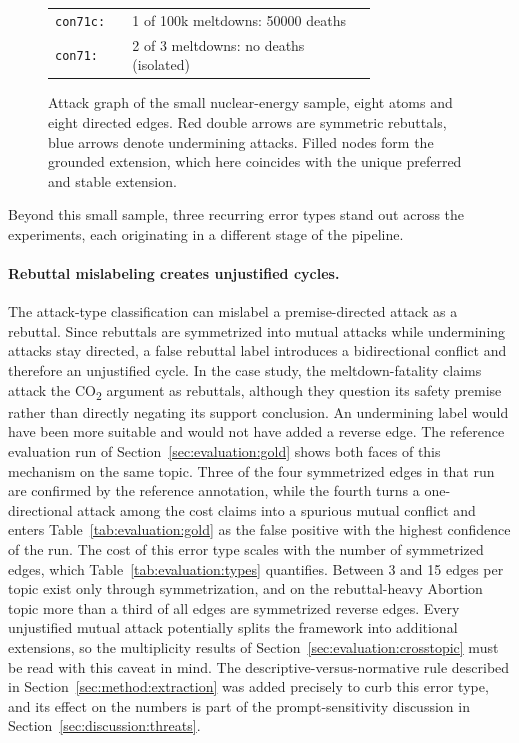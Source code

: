 \begin{figure}[tb]
\begin{minipage}[c]{0.48\linewidth}
\begin{tabular}{@{}l@{\ }p{0.76\linewidth}@{}}
      \texttt{con71c:} & 1 of 100k meltdowns: 50000 deaths \\
      \texttt{con71:}  & 2 of 3 meltdowns: no deaths (isolated) \\
    \end{tabular}
  \end{minipage}
  \caption{Attack graph of the small nuclear-energy sample, eight atoms and eight
  directed edges. Red double arrows are symmetric rebuttals, blue arrows denote
  undermining attacks. Filled nodes form the grounded extension, which here
  coincides with the unique preferred and stable extension.}
  \label{fig:evaluation:nuclear}
\end{figure}

Beyond this small sample, three recurring error types stand out across the
experiments, each originating in a different stage of the pipeline.

\paragraph{Rebuttal mislabeling creates unjustified cycles.}
The attack-type classification can mislabel a premise-directed attack as a
rebuttal. Since rebuttals are symmetrized into mutual attacks while undermining
attacks stay directed, a false rebuttal label introduces a bidirectional
conflict and therefore an unjustified cycle. In the case study, the
meltdown-fatality claims attack the CO\textsubscript{2} argument as rebuttals,
although they question its safety premise rather than directly negating its
support conclusion. An undermining label would have been more suitable and
would not have added a reverse edge. The reference evaluation run of
Section~\ref{sec:evaluation:gold} shows both faces of this mechanism on the
same topic. Three of the four symmetrized edges in that run are confirmed by
the reference annotation, while the fourth turns a one-directional attack among the
cost claims into a spurious mutual conflict and enters
Table~\ref{tab:evaluation:gold} as the false positive with the highest
confidence of the run. The cost of this error type scales with
the number of symmetrized edges, which
Table~\ref{tab:evaluation:types} quantifies. Between 3 and 15 edges per topic
exist only through symmetrization, and on the rebuttal-heavy Abortion topic
more than a third of all edges are symmetrized reverse edges. Every unjustified
mutual attack potentially splits the framework into additional extensions, so
the multiplicity results of Section~\ref{sec:evaluation:crosstopic} must be
read with this caveat in mind. The descriptive-versus-normative rule described
in Section~\ref{sec:method:extraction} was added precisely to curb this error
type, and its effect on the numbers is part of the prompt-sensitivity
discussion in Section~\ref{sec:discussion:threats}.

